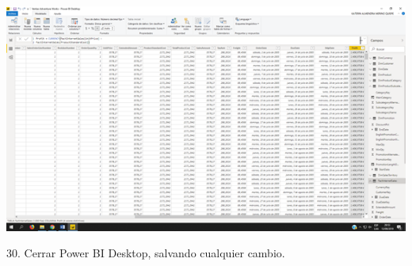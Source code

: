 \begin{center}
\includegraphics[width=15cm]{./Imagenes/img31} 
\end{center}

\item 30. Cerrar Power BI Desktop, salvando cualquier cambio.
